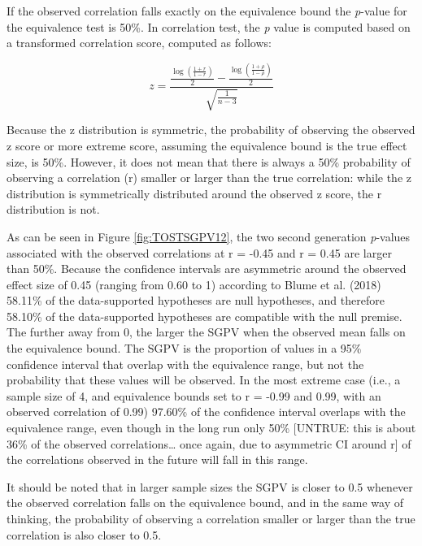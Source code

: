 \documentclass[,man,floatsintext]{apa6}
\begin{document}
If the observed correlation falls exactly on the equivalence bound the \emph{p}-value for the equivalence test is 50\%. In correlation test, the \emph{p} value is computed based on a transformed correlation score, computed as follows:

\[
z = \frac{\frac{\log(\frac{1 + r}{ 1 - r})}{2} - \frac{\log(\frac{1 + \rho}{ 1 - \rho})}{2}}{\sqrt{\frac{1}{n-3}}}
\]

Because the z distribution is symmetric, the probability of observing the observed z score or more extreme score, assuming the equivalence bound is the true effect size, is 50\%. However, it does not mean that there is always a 50\% probability of observing a correlation (r) smaller or larger than the true correlation: while the z distribution is symmetrically distributed around the observed z score, the r distribution is not.

As can be seen in Figure \ref{fig:TOSTSGPV12}, the two second generation \emph{p}-values associated with the observed correlations at r = -0.45 and r = 0.45 are larger than 50\%. Because the confidence intervals are asymmetric around the observed effect size of 0.45 (ranging from 0.60 to 1) according to Blume et al. (2018) 58.11\% of the data-supported hypotheses are null hypotheses, and therefore 58.10\% of the data-supported hypotheses are compatible with the null premise. The further away from 0, the larger the SGPV when the observed mean falls on the equivalence bound. The SGPV is the proportion of values in a 95\% confidence interval that overlap with the equivalence range, but not the probability that these values will be observed. In the most extreme case (i.e., a sample size of 4, and equivalence bounds set to r = -0.99 and 0.99, with an observed correlation of 0.99) 97.60\% of the confidence interval overlaps with the equivalence range, even though in the long run only 50\% {[}UNTRUE: this is about 36\% of the observed correlations\ldots{} once again, due to asymmetric CI around r{]} of the correlations observed in the future will fall in this range.

It should be noted that in larger sample sizes the SGPV is closer to 0.5 whenever the observed correlation falls on the equivalence bound, and in the same way of thinking, the probability of observing a correlation smaller or larger than the true correlation is also closer to 0.5.
\end{document}
